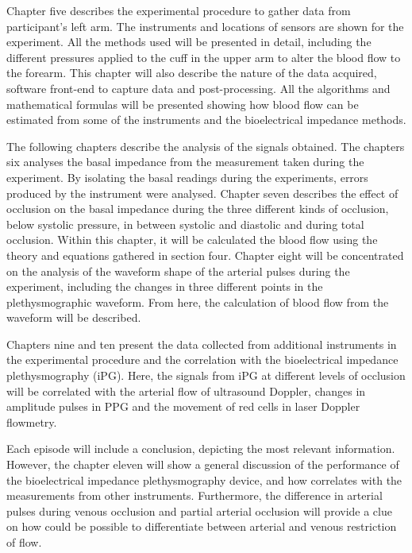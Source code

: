 Chapter five describes the experimental procedure to gather data from participant's left arm. The instruments and locations of sensors are shown for the experiment. All the methods used will be presented in detail, including the different pressures applied to the cuff in the upper arm to alter the blood flow to the forearm. This chapter will also describe the nature of the data acquired, software front-end to capture data and post-processing. All the algorithms and mathematical formulas will be presented showing how blood flow can be estimated from some of the instruments and the bioelectrical impedance methods.  

The following chapters describe the analysis of the signals obtained. The chapters six analyses the basal impedance from the measurement taken during the experiment. By isolating the basal readings during the experiments, errors produced by the instrument were analysed. Chapter seven describes the effect of occlusion on the basal impedance during the three different kinds of occlusion, below systolic pressure, in between systolic and diastolic and during total occlusion. Within this chapter, it will be calculated the blood flow using the theory and equations gathered in section four. Chapter eight will be concentrated on the analysis of the waveform shape of the arterial pulses during the experiment, including the changes in three different points in the plethysmographic waveform. From here, the calculation of blood flow from the waveform will be described. 

Chapters nine and ten present the data collected from additional instruments in the experimental procedure and the correlation with the bioelectrical impedance plethysmography (iPG). Here, the signals from iPG at different levels of occlusion will be correlated with the arterial flow of ultrasound Doppler, changes in amplitude pulses in PPG and the movement of red cells in laser Doppler flowmetry. 

Each episode will include a conclusion, depicting the most relevant information. However, the chapter eleven will show a general discussion of the performance of the bioelectrical impedance plethysmography device, and how correlates with the measurements from other instruments. Furthermore, the difference in arterial pulses during venous occlusion and partial arterial occlusion will provide a clue on how could be possible to differentiate between arterial and venous restriction of flow. 

